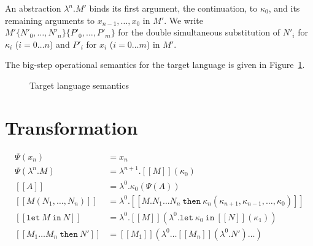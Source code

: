\documentclass[a4paper,11pt,draft]{article}
\newcommand{\kw}[1]{\mathtt{#1}}
\begin{document}
An abstraction $\lambda^{n}.M'$ binds its first argument, the continuation,
to $\kappa_{0}$, and its remaining arguments to $x_{n-1}, \ldots, x_{0}$ in
$M'$.
We write $M'\{N'_{0}, \ldots, N'_{n}\}\{P'_{0}, \ldots, P'_{m}\}$ for the
double simultaneous substitution of $N'_{i}$ for $\kappa_{i}$
($i = 0 \ldots n$) and $P'_{i}$ for $x_{i}$ ($i = 0 \ldots m$) in $M'$.

The big-step operational semantics for the target language is given in
Figure~\ref{fig:targetsemantics}.

\begin{figure}
\caption{Target language semantics}
\label{fig:targetsemantics}
\end{figure}


\section{Transformation}\label{sec:transformation}

\begin{align*}
\Psi(x_{n}) &=
  x_{n} \\
\Psi(\lambda^{n}.M) &=
  \lambda^{n+1}.[\![M]\!](\kappa_{0}) \\[1em]
[\![A]\!] &=
  \lambda^{0}.\kappa_{0} (\Psi(A)) \\
[\![M(N_{1}, \ldots, N_{n})]\!] &=
  \lambda^{0}.[\![M . N_{1} \ldots N_{n} \: \kw{then} \:
  \kappa_{n}(\kappa_{n+1}, \kappa_{n-1}, \ldots, \kappa_{0})]\!] \\
[\![\kw{let} \: M \: \kw{in} \: N]\!] &=
  \lambda^{0}.[\![M]\!] (\lambda^{0}.\kw{let} \:
  \kappa_{0} \: \kw{in} \: [\![N]\!] (\kappa_{1})) \\
[\![M_{1} \ldots M_{n} \: \kw{then} \: N']\!] &=
  [\![M_{1}]\!] (\lambda^{0} \ldots [\![M_{n}]\!] (\lambda^{0}.N') \ldots )
\end{align*}
\end{document}

